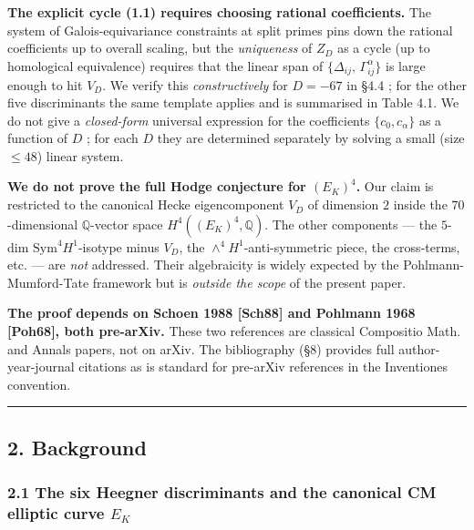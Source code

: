 \documentclass[
  11pt,
  a4paper,
]{amsart}
\begin{document}
\textbf{The explicit cycle (1.1) requires choosing rational coefficients.} The system of Galois-equivariance constraints at split primes pins down the rational coefficients up to overall scaling, but the \emph{uniqueness} of \(Z_D\) as a cycle (up to homological equivalence) requires that the linear span of \(\{\Delta_{ij},\,\Gamma_{ij}^\alpha\}\) is large enough to hit \(V_D\). We verify this \emph{constructively} for \(D = -67\) in §4.4 ; for the other five discriminants the same template applies and is summarised in Table 4.1. We do not give a \emph{closed-form} universal expression for the coefficients \(\{c_0, c_\alpha\}\) as a function of \(D\) ; for each \(D\) they are determined separately by solving a small (size \(\leq 48\)) linear system.

\textbf{We do not prove the full Hodge conjecture for \((E_K)^4\).} Our claim is restricted to the canonical Hecke eigencomponent \(V_D\) of dimension \(2\) inside the \(70\)-dimensional \(\mathbb{Q}\)-vector space \(H^4((E_K)^4, \mathbb{Q})\). The other components --- the \(5\)-dim \(\mathrm{Sym}^4 H^1\)-isotype minus \(V_D\), the \(\wedge^4 H^1\)-anti-symmetric piece, the cross-terms, etc. --- are \emph{not} addressed. Their algebraicity is widely expected by the Pohlmann-Mumford-Tate framework but is \emph{outside the scope} of the present paper.

\textbf{The proof depends on Schoen 1988 {[}Sch88{]} and Pohlmann 1968 {[}Poh68{]}, both pre-arXiv.} These two references are classical Compositio Math. and Annals papers, not on arXiv. The bibliography (§8) provides full author-year-journal citations as is standard for pre-arXiv references in the Inventiones convention.

\begin{center}\rule{0.5\linewidth}{0.5pt}\end{center}

\hypertarget{background}{%
\subsection{2. Background}\label{background}}

\hypertarget{the-six-heegner-discriminants-and-the-canonical-cm-elliptic-curve-e_k}{%
\subsubsection{\texorpdfstring{2.1 The six Heegner discriminants and the canonical CM elliptic curve \(E_K\)}{2.1 The six Heegner discriminants and the canonical CM elliptic curve E\_K}}\label{the-six-heegner-discriminants-and-the-canonical-cm-elliptic-curve-e_k}}
\end{document}
